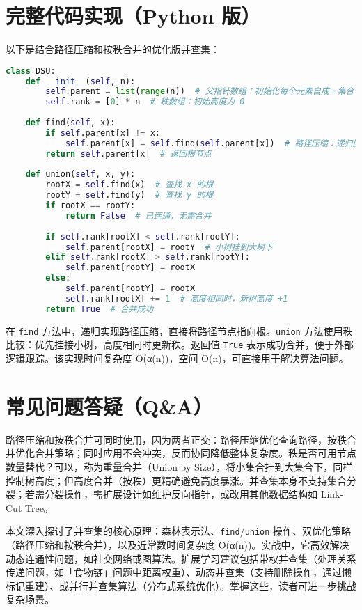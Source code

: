 \chapter{完整代码实现（Python 版）}
以下是结合路径压缩和按秩合并的优化版并查集：\par
\begin{lstlisting}[language=python]
class DSU:
    def __init__(self, n):
        self.parent = list(range(n))  # 父指针数组：初始化每个元素自成一集合
        self.rank = [0] * n  # 秩数组：初始高度为 0
    
    def find(self, x):
        if self.parent[x] != x:
            self.parent[x] = self.find(self.parent[x])  # 路径压缩：递归压扁路径
        return self.parent[x]  # 返回根节点
    
    def union(self, x, y):
        rootX = self.find(x)  # 查找 x 的根
        rootY = self.find(y)  # 查找 y 的根
        if rootX == rootY:
            return False  # 已连通，无需合并
        
        if self.rank[rootX] < self.rank[rootY]:
            self.parent[rootX] = rootY  # 小树挂到大树下
        elif self.rank[rootX] > self.rank[rootY]:
            self.parent[rootY] = rootX
        else:
            self.parent[rootY] = rootX
            self.rank[rootX] += 1  # 高度相同时，新树高度 +1
        return True  # 合并成功
\end{lstlisting}
在 \texttt{find} 方法中，递归实现路径压缩，直接将路径节点指向根。\texttt{union} 方法使用秩比较：优先挂接小树，高度相同时更新秩。返回值 \texttt{True} 表示成功合并，便于外部逻辑跟踪。该实现时间复杂度 O(α(n))，空间 O(n)，可直接用于解决算法问题。\par
\chapter{常见问题答疑（Q\&{}A）}
路径压缩和按秩合并可同时使用，因为两者正交：路径压缩优化查询路径，按秩合并优化合并策略；同时应用不会冲突，反而协同降低整体复杂度。秩是否可用节点数量替代？可以，称为重量合并（Union by Size），将小集合挂到大集合下，同样控制树高度；但高度合并（按秩）更精确避免高度暴涨。并查集本身不支持集合分裂；若需分裂操作，需扩展设计如维护反向指针，或改用其他数据结构如 Link-Cut Tree。\par
本文深入探讨了并查集的核心原理：森林表示法、\texttt{find}/\texttt{union} 操作、双优化策略（路径压缩和按秩合并），以及近常数时间复杂度 O(α(n))。实战中，它高效解决动态连通性问题，如社交网络或图算法。扩展学习建议包括带权并查集（处理关系传递问题，如「食物链」问题中距离权重）、动态并查集（支持删除操作，通过懒标记重建）、或并行并查集算法（分布式系统优化）。掌握这些，读者可进一步挑战复杂场景。\par
